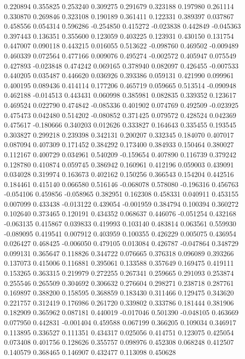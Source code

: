 0.220894
0.355825
0.253240
0.309275
0.291679
0.323188
0.197980
0.261114
0.330870
0.269846
0.323108
0.190189
0.361411
0.122331
0.389397
0.037867
0.458556
0.054314
0.596286
-0.254850
0.415272
-0.023838
0.442849
-0.045363
0.397443
0.136351
0.355600
0.123059
0.403225
0.123931
0.430150
0.131754
0.447007
0.090118
0.443215
0.016055
0.513622
-0.098760
0.469502
-0.009489
0.460339
0.072564
0.477166
0.009076
0.495274
-0.002572
0.405947
0.075549
0.427893
-0.023848
0.474242
0.069165
0.378940
0.082097
0.426455
-0.007533
0.440205
0.035487
0.446620
0.036926
0.393386
0.059131
0.421990
0.099961
0.400195
0.089436
0.414114
0.177206
0.465719
0.059665
0.513514
-0.090948
0.462188
-0.014513
0.443431
0.060998
0.385981
0.082835
0.339352
0.123617
0.469524
0.022790
0.474842
-0.085336
0.401902
0.074769
0.492509
-0.023925
0.475473
0.042480
0.514202
-0.080852
0.371425
0.079572
0.428524
0.042369
0.475617
-0.180666
0.340203
0.012626
0.333827
0.164643
0.335455
0.193545
0.303827
0.299218
0.239398
0.342131
0.200207
0.332345
0.184070
0.407017
0.087094
0.407309
0.171452
0.384292
0.173400
0.384933
0.150464
0.380027
0.112167
0.400729
0.034961
0.540209
-0.159654
0.407890
0.116739
0.379242
0.128780
0.410874
0.059745
0.386942
0.160961
0.412196
0.059003
0.439091
0.034028
0.319974
0.163673
0.402162
0.150256
0.366543
0.154204
0.442516
0.184461
0.415140
0.066580
0.516146
-0.068078
0.578080
-0.196316
0.456763
-0.054106
0.459856
-0.058965
0.382951
0.162308
0.458331
0.040911
0.453155
0.007099
0.433438
-0.013122
0.439054
-0.001959
0.384794
0.100394
0.360272
0.102640
0.373465
0.120191
0.434352
0.068637
0.446076
-0.051254
0.432168
-0.063135
0.415867
0.039833
0.419993
0.103140
0.483814
0.063561
0.559930
-0.089095
0.419541
0.007912
0.403959
0.100355
0.426229
0.005075
0.436954
0.026427
0.468425
-0.006050
0.479105
0.013084
0.426787
-0.047864
0.348729
0.099131
0.365647
0.118826
0.344722
0.076665
0.376318
0.096089
0.393266
0.137073
0.415006
0.116881
0.395061
0.133588
0.357649
0.169475
0.419111
0.153265
0.363315
0.219979
0.272255
0.267341
0.259665
0.291093
0.253874
0.255546
0.265509
0.304692
0.306632
0.276604
0.298271
0.238718
0.287761
0.169897
0.388200
0.158595
0.368859
0.183430
0.311466
0.129475
0.343620
0.221757
0.312419
0.176986
0.261720
0.339802
0.333786
0.181444
0.381906
0.182909
0.365962
0.087181
0.440019
-0.017046
0.501390
-0.048105
0.463669
0.077950
0.442831
-0.001404
0.459588
0.067199
0.366205
0.109034
0.346917
0.113895
0.336527
0.111351
0.434317
0.025056
0.414751
0.123075
0.425054
0.073408
0.401756
0.128626
0.355757
0.098976
0.452308
0.068248
0.412507
0.140579
0.368465
0.146907
0.432477
0.113098
0.450628

